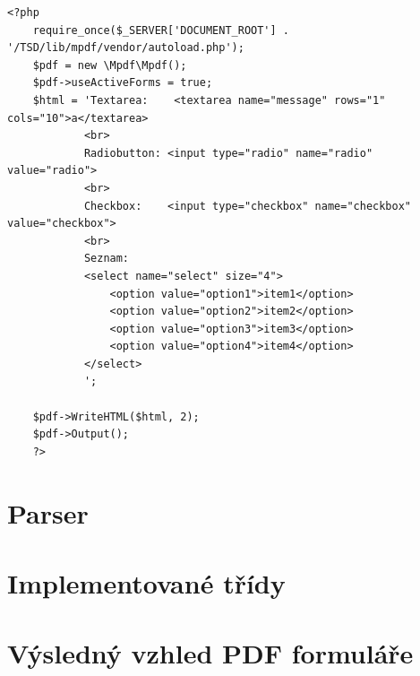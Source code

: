 \begin{lstlisting}[caption = {Zdrojový kód psaný v PHP využívající knihovnu mPDF}, label = {lst:mpdf_code}, captionpos=b]
    <?php
    require_once($_SERVER['DOCUMENT_ROOT'] . '/TSD/lib/mpdf/vendor/autoload.php');
    $pdf = new \Mpdf\Mpdf(); 
    $pdf->useActiveForms = true;        
    $html = 'Textarea:    <textarea name="message" rows="1" cols="10">a</textarea>
            <br>
            Radiobutton: <input type="radio" name="radio" value="radio">
            <br>
            Checkbox:    <input type="checkbox" name="checkbox" value="checkbox">
            <br>
            Seznam:
            <select name="select" size="4">
                <option value="option1">item1</option>
                <option value="option2">item2</option>
                <option value="option3">item3</option>
                <option value="option4">item4</option>
            </select>
            ';

    $pdf->WriteHTML($html, 2);
    $pdf->Output();
    ?>
\end{lstlisting}

\section{Parser}

\section{Implementované třídy}

\section{Výsledný vzhled PDF formuláře}

